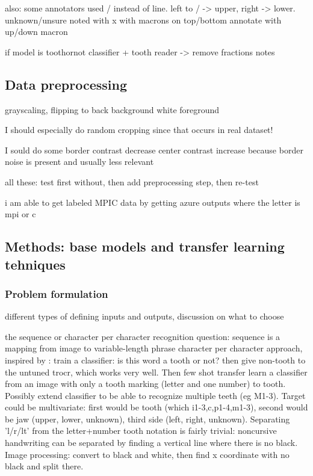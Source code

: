 \documentclass{article}
\begin{document}
also: some annotators used / instead of line. left to / -> upper, right -> lower.
unknown/unsure noted with x with macrons on top/bottom
annotate with up/down macron

if model is toothornot classifier + tooth reader -> remove fractions notes

\subsection{Data preprocessing}

grayscaling, flipping to back background white foreground

I should especially do random cropping since that occurs in real dataset!

I sould do some border contrast decrease center contrast increase because border noise is present and usually less relevant 

all these: test first without, then add preprocessing step, then re-test

i am able to get labeled MPIC data by getting azure outputs where the letter is mpi or c

\subsection{Methods: base models and transfer learning tehniques}

\subsubsection{Problem formulation}

different types of defining inputs and outputs, discussion on what to choose

the sequence or character per character recognition question:
sequence is a mapping from image to variable-length phrase
character per character approach, inspired by \cite{tibetan_ocr}:
train a classifier: is this word a tooth or not? then give non-tooth to the untuned
trocr, which works very well. Then few shot transfer learn a classifier from an image
with only a tooth marking (letter and one number) to tooth. Possibly extend classifier to 
be able to recognize multiple teeth (eg M1-3). Target could be multivariate: first would
be tooth (which i1-3,c,p1-4,m1-3), second would be jaw (upper, lower, unknown), third side 
(left, right, unknown). Separating 'l/r/lt' from the letter+number tooth notation is 
fairly trivial: noncursive handwriting can be separated by finding a vertical line where there 
is no black. Image processing: convert to black and white, then find x coordinate with no black 
and split there.
\end{document}
